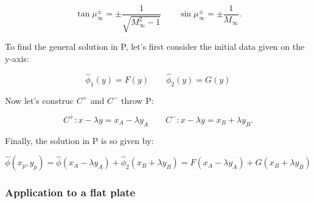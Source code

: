 	\begin{equation}
	\tan \mu _\infty ^\pm = \pm \frac{1}{\sqrt{M_\infty ^2 -1}} \qquad \sin \mu _\infty ^\pm = \pm \frac{1}{M_\infty}.
	\end{equation}
	
	To find the general solution in P, let's first consider the initial data given on the y-axis: 
	
	\begin{equation}
	\hat{\phi} _1(y) = F(y)\qquad \hat{\phi}_2 (y) = G(y)
	\end{equation}
	
	Now let's construc $C^+$ and $C^-$ throw P: 
	
	\begin{equation}
	C^+ : x-\lambda y = x_A - \lambda y_A\qquad C^- : x-\lambda y = x_B + \lambda y_B.
	\end{equation}
	
	Finally, the solution in P is so given by:
	
	\begin{equation}
	\hat{ \phi} (x_p,y_p) = \hat{\phi} (x_A - \lambda y_A) + \hat{\phi} _2 (x_B + \lambda y_B) = F (x_A - \lambda y_A) + G (x_B + \lambda y_B)
	\end{equation}
	
\subsubsection{Application to a flat plate}
	